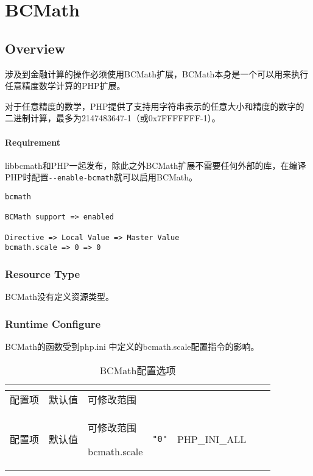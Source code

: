 \part{BCMath}


\chapter{Overview}

涉及到金融计算的操作必须使用BCMath扩展，BCMath本身是一个可以用来执行任意精度数学计算的PHP扩展。

对于任意精度的数学，PHP提供了支持用字符串表示的任意大小和精度的数字的二进制计算，最多为2147483647-1（或0x7FFFFFFF-1）。






\subsection{Requirement}

libbcmath和PHP一起发布，除此之外BCMath扩展不需要任何外部的库，在编译PHP时配置\texttt{-\/-enable-bcmath}就可以启用BCMath。

\begin{lstlisting}[language=plain]
bcmath

BCMath support => enabled

Directive => Local Value => Master Value
bcmath.scale => 0 => 0
\end{lstlisting}

\section{Resource Type}

BCMath没有定义资源类型。





\section{Runtime Configure}

BCMath的函数受到php.ini 中定义的bcmath.scale配置指令的影响。


\begin{longtable}{|m{150pt}|m{40pt}|m{120pt}|}
\tabularnewline\hline
配置项&默认值&可修改范围
\endhead

\caption{BCMath配置选项}\\
\hline
配置项&默认值&可修改范围
\endfirsthead

\endfoot

\endlastfoot
\hline
bcmath.scale & \texttt{"0"}& PHP\_INI\_ALL\\
\hline
\end{longtable}


